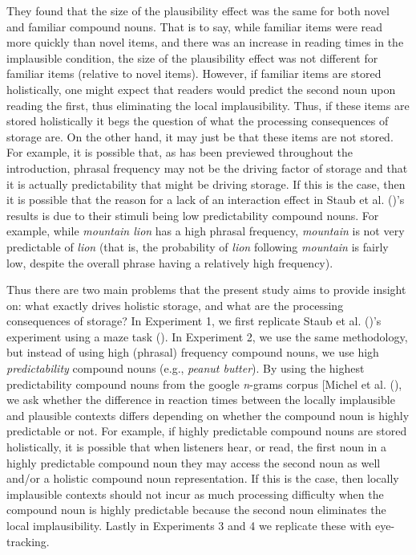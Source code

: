 \documentclass[
  12pt,
  letterpaper,
]{scrreprt}
\begin{document}
\noindent They found that the size of the plausibility effect was the
same for both novel and familiar compound nouns. That is to say, while
familiar items were read more quickly than novel items, and there was an
increase in reading times in the implausible condition, the size of the
plausibility effect was not different for familiar items (relative to
novel items). However, if familiar items are stored holistically, one
might expect that readers would predict the second noun upon reading the
first, thus eliminating the local implausibility. Thus, if these items
are stored holistically it begs the question of what the processing
consequences of storage are. On the other hand, it may just be that
these items are not stored. For example, it is possible that, as has
been previewed throughout the introduction, phrasal frequency may not be
the driving factor of storage and that it is actually predictability
that might be driving storage. If this is the case, then it is possible
that the reason for a lack of an interaction effect in Staub et al.
()'s results is due
to their stimuli being low predictability compound nouns. For example,
while \emph{mountain lion} has a high phrasal frequency, \emph{mountain}
is not very predictable of \emph{lion} (that is, the probability of
\emph{lion} following \emph{mountain} is fairly low, despite the overall
phrase having a relatively high frequency).

Thus there are two main problems that the present study aims to provide
insight on: what exactly drives holistic storage, and what are the
processing consequences of storage? In Experiment 1, we first replicate
Staub et al. ()'s
experiment using a maze task (). In Experiment 2, we use the same methodology, but
instead of using high (phrasal) frequency compound nouns, we use high
\emph{predictability} compound nouns (e.g., \emph{peanut butter}). By
using the highest predictability compound nouns from the google
\emph{n}-grams corpus {[}Michel et al.
(), we ask
whether the difference in reaction times between the locally implausible
and plausible contexts differs depending on whether the compound noun is
highly predictable or not. For example, if highly predictable compound
nouns are stored holistically, it is possible that when listeners hear,
or read, the first noun in a highly predictable compound noun they may
access the second noun as well and/or a holistic compound noun
representation. If this is the case, then locally implausible contexts
should not incur as much processing difficulty when the compound noun is
highly predictable because the second noun eliminates the local
implausibility. Lastly in Experiments 3 and 4 we replicate these with
eye-tracking.
\end{document}
